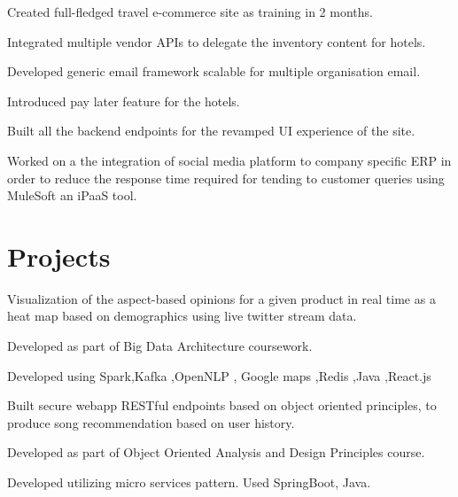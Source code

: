 \documentclass[]{deedy-resume-openfont}
\begin{document}
\begin{minipage}[t]{0.66\textwidth}
\begin{tightemize}
\item Created full-fledged travel e-commerce site as training in 2 months.
\item Integrated multiple vendor APIs to delegate the inventory content for hotels.
\item Developed generic email framework scalable for multiple organisation email.
\item Introduced pay later feature for the hotels.
\item Built all the backend endpoints for the revamped UI experience of the site. 
\end{tightemize}
\sectionsep

\begin{tightemize}
\item Worked on a the integration of social media platform to company specific ERP in order to reduce the response time required  for tending to customer queries using MuleSoft  an iPaaS tool.
\end{tightemize}
\sectionsep




\section{Projects}
\begin{tightemize}
\item  Visualization of the aspect-based opinions for a given product in real time as a heat map based on demographics using live twitter stream data.
\item Developed as part of Big Data Architecture coursework.
\item Developed using Spark,Kafka ,OpenNLP , Google maps ,Redis ,Java ,React.js
\end{tightemize}
\sectionsep

\begin{tightemize}
\item Built secure webapp RESTful endpoints based on object oriented principles, to produce song recommendation based on user history.
\item Developed as part of Object Oriented Analysis and Design Principles course.
\item Developed utilizing micro services pattern. Used SpringBoot, Java.
\end{tightemize}
\sectionsep
	

\end{minipage}
\end{document}
